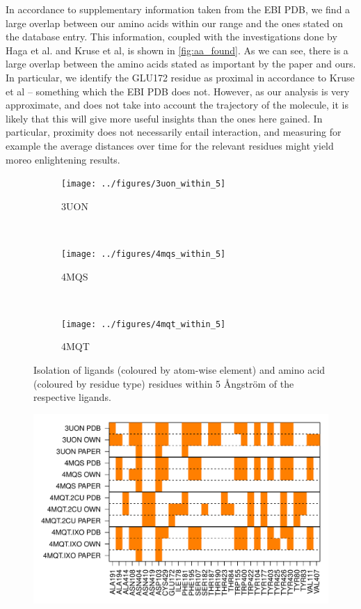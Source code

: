 \documentclass[10pt]{article}\usepackage[]{graphicx}\usepackage[]{color}
\makeatletter
\def\maxwidth{ %
  \ifdim\Gin@nat@width>\linewidth
    \linewidth
  \else
    \Gin@nat@width
  \fi
}
\theoremstyle{plain}
\makeatother
\begin{document}
\begin{multicols*}{2}
In accordance to supplementary information taken from the EBI PDB, we find a large overlap between our amino acids within our range and the ones stated on the database entry. This information, coupled with the investigations done by Haga et al. and Kruse et al, is shown in \cref{fig:aa_found}. As we can see, there is a large overlap between the amino acids stated as important by the paper and ours. In particular, we identify the GLU172 residue as proximal in accordance to Kruse et al -- something which the EBI PDB does not. However, as our analysis is very approximate, and does not take into account the trajectory of the molecule, it is likely that this will give more useful insights than the ones here gained. In particular, proximity does not necessarily entail interaction, and measuring for example the average distances over time for the relevant residues might yield moreo enlightening results. 

  \begin{figure}[H]
    \centering
    \begin{subfigure}[H]{.33\textwidth}
      \texttt{[image: ../figures/3uon\_within\_5]}
      \caption{3UON}
    \end{subfigure}\\
    \begin{subfigure}[H]{.33\textwidth}
      \texttt{[image: ../figures/4mqs\_within\_5]}
      \caption{4MQS}
    \end{subfigure}\\
    \begin{subfigure}[H]{.33\textwidth}
      \texttt{[image: ../figures/4mqt\_within\_5]}
      \caption{4MQT}
    \end{subfigure}%
    \caption{Isolation of ligands (coloured by atom-wise element) and amino acid (coloured by residue type) residues within 5 Ångström of the respective ligands.}
    \label{fig:within_5}
  \end{figure}

\begin{Schunk}
\begin{figure}[H]

{\centering \includegraphics[width=\maxwidth]{figure/twocolumn-aa_found-1} 

}
\end{figure}
\end{Schunk}
\end{multicols*}
\end{document}
